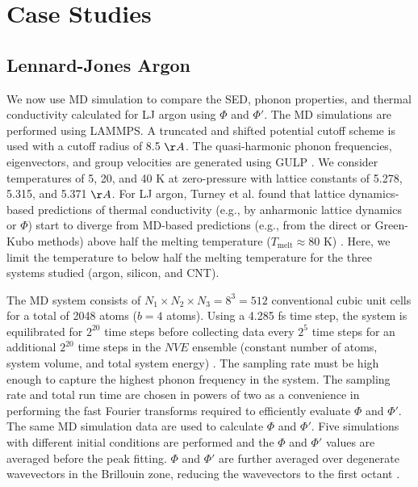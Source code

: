 \section{\label{S:Section_Prop}Case Studies}
\subsection{\label{S:Subsection_prop_LJ}Lennard-Jones Argon}
We now use MD simulation to compare the SED, phonon properties, and 
thermal conductivity 
calculated for LJ argon using $\Phi$ and $\Phi'$. The MD simulations are 
performed using 
LAMMPS.\cite{plimpton_fast_1995} A truncated and shifted
potential cutoff scheme is used with a cutoff radius of 8.5 $\AA$. 
The 
quasi-harmonic 
phonon frequencies, eigenvectors, and group velocities are generated 
using GULP \cite{gale_general_2003}.
 We consider temperatures of 5, 20, and 40 K at zero-pressure with lattice 
 constants of 
5.278, 5.315, and 5.371 $\AA$. For LJ argon, Turney et al. found that 
lattice dynamics-based 
predictions of thermal conductivity (e.g., by anharmonic lattice dynamics 
or $\Phi$) start to 
diverge from MD-based predictions (e.g., from the direct or Green-Kubo 
methods) above half the 
melting temperature ($T_{\mathrm{melt}} \approx 80$ K) 
\cite{turney_predicting_2009}.
Here, we limit the 
temperature to below half the melting temperature for the three systems 
studied (argon, 
silicon, and CNT).

The MD system consists of $N_1 \times N_2 \times N_3 = 8^3 = 512$ 
conventional cubic unit 
cells for a total of 2048 atoms ($b=4$ atoms). Using a 4.285 fs time step, 
the system is 
equilibrated for $2^{20}$ time steps before collecting data every $2^5$ 
time steps for an 
additional $2^{20}$ time steps in the $NVE$ ensemble (constant number of 
atoms, system volume, 
and total system energy) \cite{mcquarrie_statistical_2000}. 
The sampling rate must be high enough to capture 
the highest phonon frequency in the system. The sampling rate and total 
run time are chosen in 
powers of two as a convenience in performing the fast Fourier transforms 
required to efficiently 
evaluate $\Phi$ and $\Phi'$. The same MD simulation data are used to 
calculate $\Phi$ and $\Phi'$.  
Five simulations with different initial conditions are performed and the 
$\Phi$ and $\Phi'$ 
values are averaged before the peak fitting. $\Phi$ and $\Phi'$ are further 
averaged over 
degenerate wavevectors in the Brillouin zone, reducing the wavevectors to 
the first octant 
\cite{mcgaughey_phonon_2004}.

